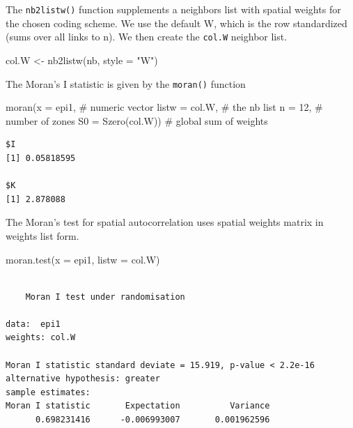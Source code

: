 \documentclass[
  letterpaper,
  DIV=11,
  numbers=noendperiod]{scrreprt}
\newenvironment{Shaded}{\begin{snugshade}}{\end{snugshade}}
\newcommand{\AttributeTok}[1]{\textcolor[rgb]{0.40,0.45,0.13}{#1}}
\newcommand{\CommentTok}[1]{\textcolor[rgb]{0.37,0.37,0.37}{#1}}
\newcommand{\DecValTok}[1]{\textcolor[rgb]{0.68,0.00,0.00}{#1}}
\newcommand{\FunctionTok}[1]{\textcolor[rgb]{0.28,0.35,0.67}{#1}}
\newcommand{\NormalTok}[1]{\textcolor[rgb]{0.00,0.23,0.31}{#1}}
\newcommand{\OtherTok}[1]{\textcolor[rgb]{0.00,0.23,0.31}{#1}}
\newcommand{\StringTok}[1]{\textcolor[rgb]{0.13,0.47,0.30}{#1}}
\begin{document}
The \texttt{nb2listw()} function supplements a neighbors list with
spatial weights for the chosen coding scheme. We use the default W,
which is the row standardized (sums over all links to n). We then create
the \texttt{col.W} neighbor list.

\begin{Shaded}
\begin{Highlighting}[]
\NormalTok{col.W }\OtherTok{\textless{}{-}} \FunctionTok{nb2listw}\NormalTok{(nb, }\AttributeTok{style =} \StringTok{"W"}\NormalTok{)}
\end{Highlighting}
\end{Shaded}

The Moran's I statistic is given by the \texttt{moran()} function

\begin{Shaded}
\begin{Highlighting}[]
\FunctionTok{moran}\NormalTok{(}\AttributeTok{x =}\NormalTok{ epi1, }\CommentTok{\# numeric vector}
      \AttributeTok{listw =}\NormalTok{ col.W, }\CommentTok{\# the nb list}
      \AttributeTok{n =} \DecValTok{12}\NormalTok{, }\CommentTok{\# number of zones}
      \AttributeTok{S0 =} \FunctionTok{Szero}\NormalTok{(col.W)) }\CommentTok{\# global sum of weights}
\end{Highlighting}
\end{Shaded}

\begin{verbatim}
$I
[1] 0.05818595

$K
[1] 2.878088
\end{verbatim}

The Moran's test for spatial autocorrelation uses spatial weights matrix
in weights list form.

\begin{Shaded}
\begin{Highlighting}[]
\FunctionTok{moran.test}\NormalTok{(}\AttributeTok{x =}\NormalTok{ epi1, }
           \AttributeTok{listw =}\NormalTok{ col.W)}
\end{Highlighting}
\end{Shaded}

\begin{verbatim}

    Moran I test under randomisation

data:  epi1  
weights: col.W    

Moran I statistic standard deviate = 15.919, p-value < 2.2e-16
alternative hypothesis: greater
sample estimates:
Moran I statistic       Expectation          Variance 
      0.698231416      -0.006993007       0.001962596 
\end{verbatim}
\end{document}
